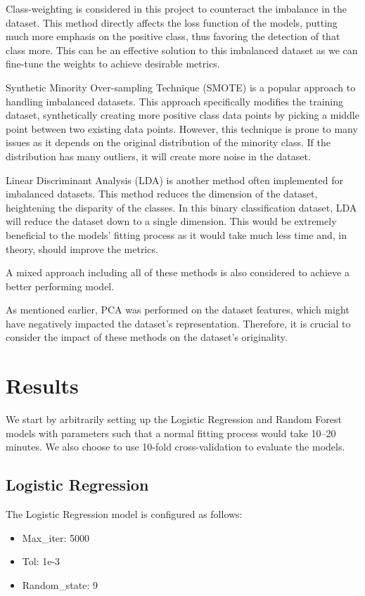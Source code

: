 \documentclass[12pt, letterpaper]{article}
\begin{document}
        Class-weighting is considered in this project to counteract the imbalance in the dataset. This method directly affects the loss function of the models, putting much more emphasis on the positive class, thus favoring the detection of that class more. This can be an effective solution to this imbalanced dataset as we can fine-tune the weights to achieve desirable metrics.

        Synthetic Minority Over-sampling Technique (SMOTE) is a popular approach to handling imbalanced datasets. This approach specifically modifies the training dataset, synthetically creating more positive class data points by picking a middle point between two existing data points. However, this technique is prone to many issues as it depends on the original distribution of the minority class. If the distribution has many outliers, it will create more noise in the dataset. 
    
        Linear Discriminant Analysis (LDA) is another method often implemented for imbalanced datasets. This method reduces the dimension of the dataset, heightening the disparity of the classes. In this binary classification dataset, LDA will reduce the dataset down to a single dimension. This would be extremely beneficial to the models' fitting process as it would take much less time and, in theory, should improve the metrics.

        A mixed approach including all of these methods is also considered to achieve a better performing model.

        As mentioned earlier, PCA was performed on the dataset features, which might have negatively impacted the dataset's representation. Therefore, it is crucial to consider the impact of these methods on the dataset's originality.
        
\section{Results}
	We start by arbitrarily setting up the Logistic Regression and Random Forest models with parameters such that a normal fitting process would take 10--20 minutes. We also choose to use 10-fold cross-validation to evaluate the models.

    \subsection{Logistic Regression}
        The Logistic Regression model is configured as follows:
        \begin{itemize}
            \item Max\_iter: 5000
            \item Tol: 1e-3
            \item Random\_state: 9
        \end{itemize}
	    
\end{document}
